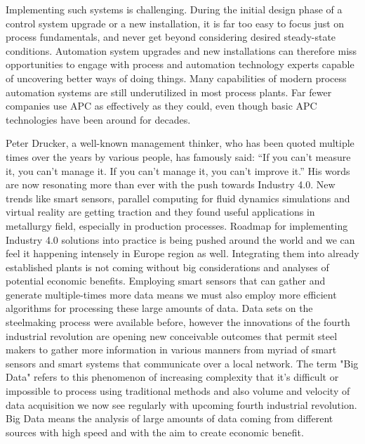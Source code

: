 Implementing such systems is challenging. During the initial design phase of a control system upgrade or a new installation, it is far too easy to focus just on process fundamentals, and never get beyond considering desired steady-state conditions. Automation system upgrades and new installations can therefore miss opportunities to engage with process and automation technology experts capable of uncovering better ways of doing things. Many capabilities of modern process automation systems are still underutilized in most process plants. Far fewer companies use APC as effectively as they could, even though basic APC technologies have been around for decades.

Peter Drucker, a well-known management thinker, who has been quoted multiple times over the years by various people, has famously said: “If you can't measure it, you can't manage it. If you can't manage it, you can't improve it.” His words are now resonating more than ever with the push towards Industry 4.0. New trends like smart sensors, parallel computing for fluid dynamics simulations and virtual reality are getting traction and they found useful applications in metallurgy field, especially in production processes. Roadmap for implementing Industry 4.0 solutions into practice is being pushed around the world and we can feel it happening intensely in Europe region as well. Integrating them into already established plants is not coming without big considerations and analyses of potential economic benefits. Employing smart sensors that can gather and generate multiple-times more data means we must also employ more efficient algorithms for processing these large amounts of data. Data sets on the steelmaking process were available before, however the innovations of the fourth industrial revolution are opening new conceivable outcomes that permit steel makers to gather more information in various manners from myriad of smart sensors and smart systems that communicate over a local network. The term "Big Data" refers to this phenomenon of increasing complexity that it’s difficult or impossible to process using traditional methods and also volume and velocity of data acquisition we now see regularly with upcoming fourth industrial revolution. Big Data means the analysis of large amounts of data coming from different sources with high speed and with the aim to create economic benefit.

